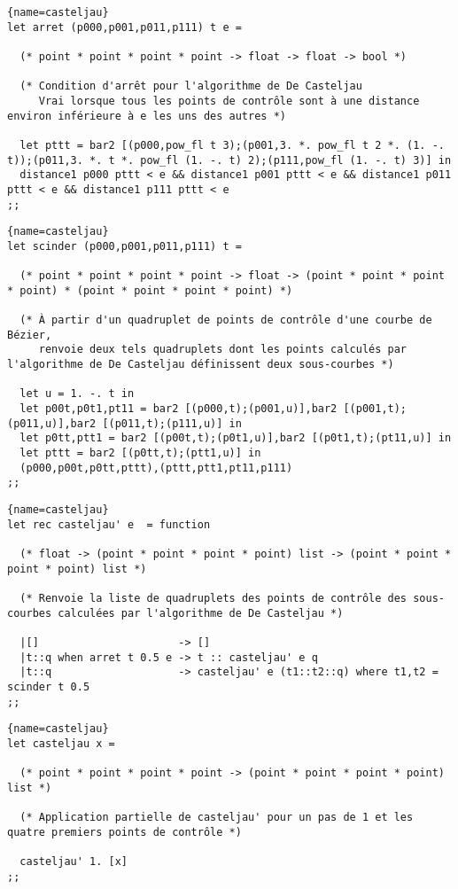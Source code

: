 \documentclass[10pt,twoside,a4paper]{article}
\begin{document}
\begin{lstlisting}{name=casteljau}
let arret (p000,p001,p011,p111) t e =

  (* point * point * point * point -> float -> float -> bool *)

  (* Condition d'arrêt pour l'algorithme de De Casteljau 
     Vrai lorsque tous les points de contrôle sont à une distance environ inférieure à e les uns des autres *)
  
  let pttt = bar2 [(p000,pow_fl t 3);(p001,3. *. pow_fl t 2 *. (1. -. t));(p011,3. *. t *. pow_fl (1. -. t) 2);(p111,pow_fl (1. -. t) 3)] in
  distance1 p000 pttt < e && distance1 p001 pttt < e && distance1 p011 pttt < e && distance1 p111 pttt < e
;;
\end{lstlisting}
\lstset{frame=single}
\begin{lstlisting}{name=casteljau}
let scinder (p000,p001,p011,p111) t =

  (* point * point * point * point -> float -> (point * point * point * point) * (point * point * point * point) *)

  (* À partir d'un quadruplet de points de contrôle d'une courbe de Bézier, 
     renvoie deux tels quadruplets dont les points calculés par l'algorithme de De Casteljau définissent deux sous-courbes *)
  
  let u = 1. -. t in
  let p00t,p0t1,pt11 = bar2 [(p000,t);(p001,u)],bar2 [(p001,t);(p011,u)],bar2 [(p011,t);(p111,u)] in
  let p0tt,ptt1 = bar2 [(p00t,t);(p0t1,u)],bar2 [(p0t1,t);(pt11,u)] in
  let pttt = bar2 [(p0tt,t);(ptt1,u)] in
  (p000,p00t,p0tt,pttt),(pttt,ptt1,pt11,p111)
;;
\end{lstlisting}
\pagebreak
\begin{lstlisting}{name=casteljau}
let rec casteljau' e  = function

  (* float -> (point * point * point * point) list -> (point * point * point * point) list *)

  (* Renvoie la liste de quadruplets des points de contrôle des sous-courbes calculées par l'algorithme de De Casteljau *)

  |[]                      -> []
  |t::q when arret t 0.5 e -> t :: casteljau' e q
  |t::q                    -> casteljau' e (t1::t2::q) where t1,t2 = scinder t 0.5
;;
\end{lstlisting}

\begin{lstlisting}{name=casteljau}
let casteljau x =

  (* point * point * point * point -> (point * point * point * point) list *)

  (* Application partielle de casteljau' pour un pas de 1 et les quatre premiers points de contrôle *)

  casteljau' 1. [x]
;;
\end{lstlisting}
\end{document}
